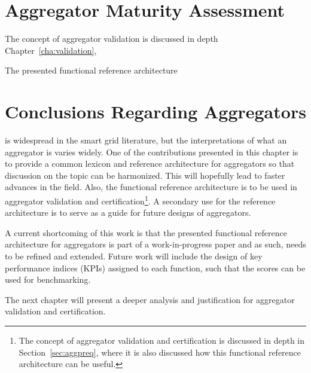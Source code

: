\section{Aggregator Maturity Assessment}
The concept of aggregator validation is discussed in depth Chapter~\ref{cha:validation},

The presented functional reference architecture

\section{Conclusions Regarding Aggregators}
 is widespread in the smart grid literature, but the interpretations of what an aggregator is varies widely. One of the contributions presented in this chapter is to provide a common lexicon and reference architecture for aggregators so that discussion on the topic can be harmonized. This will hopefully lead to faster advances in the field. Also, the functional reference architecture is to be used in aggregator validation and certification\footnote{The concept of aggregator validation and certification is discussed in depth in Section~\ref{sec:aggpreq}, where it is also discussed how this functional reference architecture can be useful.}. A secondary use for the reference architecture is to serve as a guide for future designs of aggregators.

A current shortcoming of this work is that the presented functional reference architecture for aggregators is part of a work-in-progress paper and as such, needs to be refined and extended. Future work will include the design of key performance indices (KPIs) assigned to each function, such that the scores can be used for benchmarking. 

The next chapter will present a deeper analysis and justification for aggregator validation and certification.
